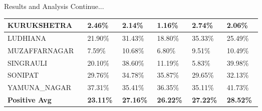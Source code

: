 \documentclass[12pt, aspectratio=169]{beamer}
\begin{document}
\begin{frame}{Results and Analysis \tiny{Continue...}}
\begin{table}
\begin{tabular}{ |p{0.19\linewidth} |p{0.08\linewidth} |p{0.08\linewidth} |p{0.08\linewidth} | p{0.08\linewidth} |p{0.08\linewidth}|}
		\scriptsize KURUKSHETRA & \scriptsize 2.46\% & \scriptsize 2.14\% & \scriptsize 1.16\% & \scriptsize 2.74\% & \scriptsize 2.06\% \\ \hline
		\scriptsize LUDHIANA & \scriptsize 21.90\% & \scriptsize 31.43\% & \scriptsize 18.80\% & \scriptsize 35.33\% & \scriptsize 25.49\% \\ \hline
		\scriptsize MUZAFFARNAGAR & \scriptsize 7.59\% & \scriptsize 10.68\% & \scriptsize 6.80\% & \scriptsize 9.51\% & \scriptsize 10.49\% \\ \hline
		\scriptsize SINGRAULI & \scriptsize 20.10\% & \scriptsize 38.60\% & \scriptsize 11.19\% & \scriptsize 5.83\% & \scriptsize 39.98\% \\ \hline
		\scriptsize SONIPAT & \scriptsize 29.76\% & \scriptsize 34.78\% & \scriptsize 35.87\% & \scriptsize 29.65\% & \scriptsize 32.13\% \\ \hline
		\scriptsize YAMUNA\_NAGAR & \scriptsize 37.31\% & \scriptsize 35.41\% & \scriptsize 36.35\% & \scriptsize 35.11\% & \scriptsize 41.73\% \\ \hline
		\scriptsize \textbf{Positive Avg} & \scriptsize \textbf{23.11\% }& \scriptsize \textbf{27.16\% }& \scriptsize \textbf{26.22\%} & \scriptsize \textbf{27.22\%} & \scriptsize \textbf{28.52\%} \\ \hline
		\end{tabular}
    \end{table}
\end{frame}




\end{document}
